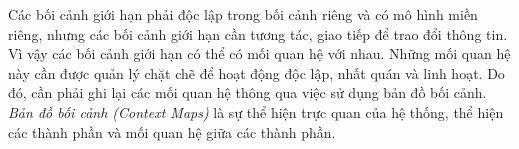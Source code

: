 Các bối cảnh giới hạn phải độc lập trong bối cảnh riêng và có mô hình miền riêng, nhưng các bối cảnh giới hạn cần tương tác, giao tiếp để trao đổi thông tin. Vì vậy các bối cảnh giới hạn có thể có mối quan hệ với nhau. Những mối quan hệ này cần được quản lý chặt chẽ để hoạt động độc lập, nhất quán và linh hoạt. Do đó, cần phải ghi lại các mối quan hệ thông qua việc sử dụng bản đồ bối cảnh. \emph{Bản đồ bối cảnh (Context Maps)} là sự thể hiện trực quan của hệ thống, thể hiện các thành phần và mối quan hệ giữa các thành phần.

